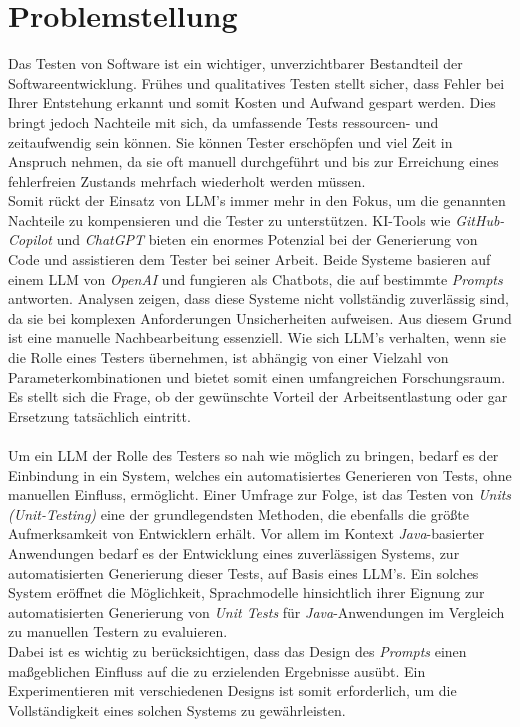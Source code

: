 \section{Problemstellung}\label{sec:prob}
Das Testen von Software ist ein wichtiger, unverzichtbarer Bestandteil der Softwareentwicklung. Frühes und qualitatives Testen stellt sicher, dass Fehler bei Ihrer Entstehung erkannt und somit Kosten und Aufwand gespart werden. Dies bringt jedoch Nachteile mit sich, da umfassende Tests ressourcen- und zeitaufwendig sein können. Sie können Tester erschöpfen und viel Zeit in Anspruch nehmen, da sie oft manuell durchgeführt und bis zur Erreichung eines fehlerfreien Zustands mehrfach wiederholt werden müssen. \cite{pargaonkar_study_2023}\\ Somit rückt der Einsatz von LLM's immer mehr in den Fokus, um die genannten Nachteile zu kompensieren und die Tester zu unterstützen. KI-Tools wie \textit{GitHub-Copilot} und \textit{ChatGPT} bieten ein enormes Potenzial bei der Generierung von Code und assistieren dem Tester bei seiner Arbeit. Beide Systeme basieren auf einem LLM von \textit{OpenAI} und fungieren als Chatbots, die auf bestimmte \textit{Prompts} antworten. Analysen zeigen, dass diese Systeme nicht vollständig zuverlässig sind, da sie bei komplexen Anforderungen Unsicherheiten aufweisen. \cite{poldrack_ai-assisted_2023} Aus diesem Grund ist eine manuelle Nachbearbeitung essenziell. Wie sich LLM's verhalten, wenn sie die Rolle eines Testers übernehmen, ist abhängig von einer Vielzahl von Parameterkombinationen und bietet somit einen umfangreichen Forschungsraum. Es stellt sich die Frage, ob der gewünschte Vorteil der Arbeitsentlastung oder gar Ersetzung tatsächlich eintritt.\\\\ Um ein LLM der Rolle des Testers so nah wie möglich zu bringen, bedarf es der Einbindung in ein System, welches ein automatisiertes Generieren von Tests, ohne manuellen Einfluss, ermöglicht. Einer Umfrage zur Folge, ist das Testen von \textit{Units} \textit{(Unit-Testing)} eine der grundlegendsten Methoden, die ebenfalls die größte Aufmerksamkeit von Entwicklern erhält. \cite{garousi_survey_2013} Vor allem im Kontext \textit{Java}-basierter Anwendungen bedarf es der Entwicklung eines zuverlässigen Systems, zur automatisierten Generierung dieser Tests, auf Basis eines LLM's. Ein solches System eröffnet die Möglichkeit, Sprachmodelle hinsichtlich ihrer Eignung zur automatisierten Generierung von \textit{Unit Tests} für \textit{Java}-Anwendungen im Vergleich zu manuellen Testern zu evaluieren.\\ Dabei ist es wichtig zu berücksichtigen, dass das Design des \textit{Prompts} einen maßgeblichen Einfluss auf die zu erzielenden Ergebnisse ausübt. Ein Experimentieren mit verschiedenen Designs ist somit erforderlich, um die Vollständigkeit eines solchen Systems zu gewährleisten.


